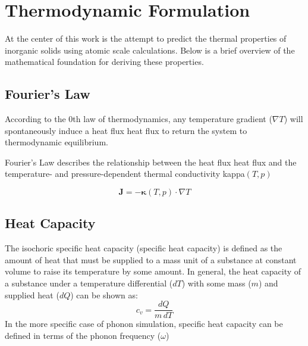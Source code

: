 
\section{Thermodynamic Formulation}

At the center of this work is the attempt to predict the thermal properties of inorganic solids using atomic scale calculations. Below is a brief overview of the mathematical foundation for deriving these properties.

\subsection{Fourier's Law}

According to the 0th law of thermodynamics, any temperature gradient ($\nabla T$) will spontaneously induce a heat flux \gls{heat flux} to return the system to thermodynamic equilibrium.

Fourier's Law describes the relationship between the heat flux \gls{heat flux} and the temperature- and pressure-dependent thermal conductivity \gls{kappa}$(T,p)$

\begin{equation}
    \boldsymbol{J} = -\boldsymbol{\kappa}(T,p)\cdot \nabla T
\end{equation}

\subsection{Heat Capacity}

The isochoric specific heat capacity (\gls{specific heat capacity}) is defined as the amount of heat that must be supplied to a mass unit of a substance at constant volume to raise its temperature by some amount. In general, the heat capacity of a substance under a temperature differential ($dT$) with some mass ($m$) and supplied heat ($dQ$) can be shown as:
\begin{equation}
    c_v=\frac{dQ}{m\,dT}
\end{equation}
In the more specific case of phonon simulation, specific heat capacity can be defined in terms of the phonon frequency ($\omega$)


